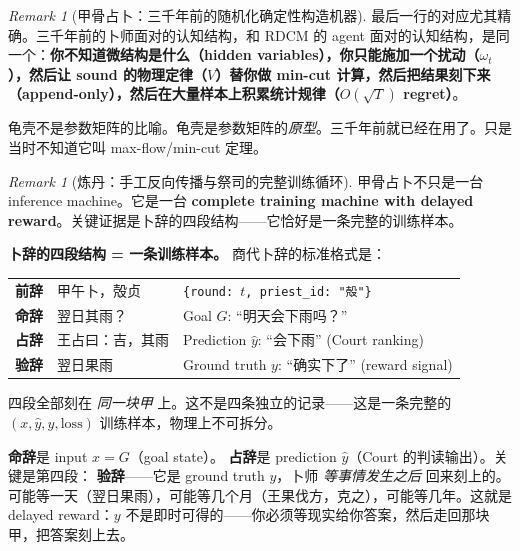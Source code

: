 \documentclass[11pt,a4paper]{article}
\theoremstyle{definition}
\theoremstyle{remark}
\newtheorem{remark}[theorem]{Remark}
\begin{document}
\begin{remark}[甲骨占卜：三千年前的随机化确定性构造机器]
最后一行的对应尤其精确。三千年前的卜师面对的认知结构，和 RDCM 的 agent 面对的认知结构，是同一个：\textbf{你不知道微结构是什么（hidden variables），你只能施加一个扰动（$\omega_t$），然后让 sound 的物理定律（$V$）替你做 min-cut 计算，然后把结果刻下来（append-only），然后在大量样本上积累统计规律（$O(\sqrt{T})$ regret）}。

龟壳不是参数矩阵的比喻。龟壳是参数矩阵的\emph{原型}。三千年前就已经在用了。只是当时不知道它叫 max-flow/min-cut 定理。
\end{remark}

\begin{remark}[炼丹：手工反向传播与祭司的完整训练循环]\label{rem:alchemy}
甲骨占卜不只是一台 inference machine。它是一台 \textbf{complete training machine with delayed reward}。关键证据是卜辞的四段结构——它恰好是一条完整的训练样本。

\textbf{卜辞的四段结构 = 一条训练样本。}
商代卜辞的标准格式是：

\begin{center}
\begin{tabular}{r@{\quad}l@{\quad}l}
{\color{gray!60} \textbf{前辞}} & {\color{gray!60} 甲午卜，殻贞} & {\color{gray!60} \texttt{\{round: $t$, priest\_id: "殻"\}}} \\[6pt]
{\color{red!70!black} \textbf{命辞}} & {\color{red!70!black} 翌日其雨？} & {\color{red!70!black} Goal $G$: ``明天会下雨吗？''} \\[6pt]
{\color{blue!70!black} \textbf{占辞}} & {\color{blue!70!black} 王占曰：吉，其雨} & {\color{blue!70!black} Prediction $\hat{y}$: ``会下雨'' (Court ranking)} \\[6pt]
{\color{green!50!black} \textbf{验辞}} & {\color{green!50!black} 翌日果雨} & {\color{green!50!black} Ground truth $y$: ``确实下了'' (reward signal)}
\end{tabular}
\end{center}

四段全部刻在 \emph{同一块甲} 上。这不是四条独立的记录——这是一条完整的 $(x, \hat{y}, y, \mathrm{loss})$ 训练样本，物理上不可拆分。

{\color{red!70!black} \textbf{命辞}}是 input $x = G$（goal state）。{\color{blue!70!black} \textbf{占辞}}是 prediction $\hat{y}$（Court 的判读输出）。关键是第四段：{\color{green!50!black} \textbf{验辞}}——它是 ground truth $y$，卜师 \emph{等事情发生之后} 回来刻上的。可能等一天（翌日果雨），可能等几个月（王果伐方，克之），可能等几年。这就是 delayed reward：$y$ 不是即时可得的——你必须等现实给你答案，然后走回那块甲，把答案刻上去。


\end{remark}
\end{document}
